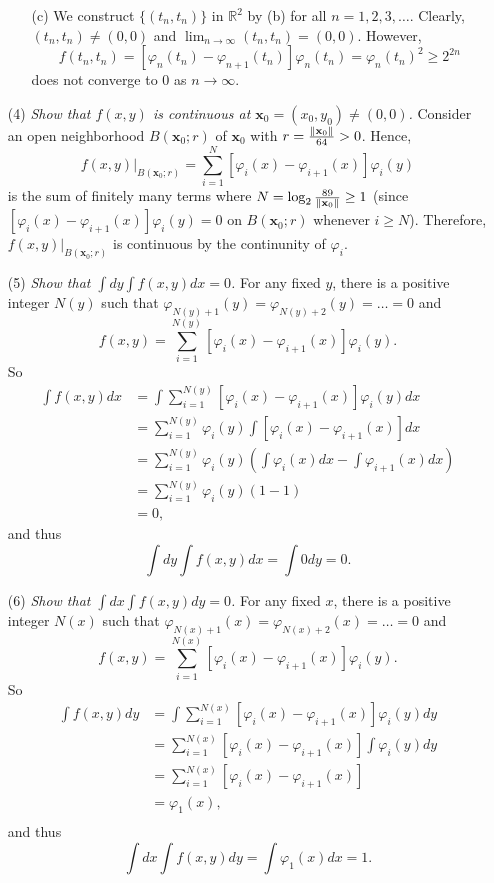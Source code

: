 \documentclass{article}
\begin{document}
\begin{enumerate}
\begin{enumerate}
  \item[(c)]
    We construct $\{ (t_n,t_n) \}$ in $\mathbb{R}^2$ by (b) for all $n=1,2,3,\ldots$.
    Clearly, $(t_n,t_n) \neq (0,0)$ and $\lim_{n \to \infty}(t_n,t_n) = (0,0)$.
    However,
    \[
      f(t_n,t_n)
      = [\varphi_{n}(t_n) - \varphi_{n+1}(t_n)]\varphi_{n}(t_n)
      = \varphi_{n}(t_n)^2
      \geq 2^{2n}
    \]
    does not converge to $0$ as $n \to \infty$.
  \end{enumerate}

\item[(4)]
  \emph{Show that $f(x,y)$ is continuous at $\mathbf{x}_0 = (x_0,y_0) \neq (0,0)$.}
  Consider an open neighborhood
  $B(\mathbf{x}_0;r)$ of $\mathbf{x}_0$ with $r=\frac{\norm{\mathbf{x}_0}}{64} > 0$.
  Hence,
  \[
    f(x,y)|_{B(\mathbf{x}_0;r)}
    = \sum_{i=1}^{N}[ \varphi_i(x)-\varphi_{i+1}(x) ] \varphi_i(y)
  \]
  is the sum of finitely many terms
  where $N = \log_2 \frac{89}{\norm{\mathbf{x}_0}} \geq 1$
  (since $[ \varphi_i(x)-\varphi_{i+1}(x) ] \varphi_i(y) = 0$
  on ${B(\mathbf{x}_0;r)}$ whenever $i \geq N$).
  Therefore,
  $f(x,y)|_{B(\mathbf{x}_0;r)}$ is continuous
  by the continunity of $\varphi_i$.

\item[(5)]
  \emph{Show that $\int dy \int f(x,y) dx = 0$.}
  For any fixed $y$,
  there is a positive integer $N(y)$ such that
  $\varphi_{N(y)+1}(y) = \varphi_{N(y)+2}(y) = \ldots = 0$ and
  \[
    f(x,y) = \sum_{i=1}^{N(y)}[ \varphi_i(x)-\varphi_{i+1}(x) ] \varphi_i(y).
  \]
  So
  \begin{align*}
    \int f(x,y) dx
    &= \int \sum_{i=1}^{N(y)}[ \varphi_i(x)-\varphi_{i+1}(x) ] \varphi_i(y) dx \\
    &= \sum_{i=1}^{N(y)} \varphi_i(y) \int [ \varphi_i(x)-\varphi_{i+1}(x) ] dx \\
    &= \sum_{i=1}^{N(y)} \varphi_i(y) \left( \int \varphi_i(x) dx - \int \varphi_{i+1}(x) dx \right) \\
    &= \sum_{i=1}^{N(y)} \varphi_i(y) \left( 1 - 1 \right) \\
    &= 0,
  \end{align*}
  and thus
  \[
    \int dy \int f(x,y) dx = \int 0 dy = 0.
  \]

\item[(6)]
  \emph{Show that $\int dx \int f(x,y) dy = 0$.}
  For any fixed $x$,
  there is a positive integer $N(x)$ such that
  $\varphi_{N(x)+1}(x) = \varphi_{N(x)+2}(x) = \ldots = 0$ and
  \[
    f(x,y) = \sum_{i=1}^{N(x)}[ \varphi_i(x)-\varphi_{i+1}(x) ] \varphi_i(y).
  \]
  So
  \begin{align*}
    \int f(x,y) dy
    &= \int \sum_{i=1}^{N(x)}[ \varphi_i(x)-\varphi_{i+1}(x) ] \varphi_i(y) dy \\
    &= \sum_{i=1}^{N(x)} [ \varphi_i(x)-\varphi_{i+1}(x) ] \int \varphi_i(y) dy \\
    &= \sum_{i=1}^{N(x)} [ \varphi_i(x)-\varphi_{i+1}(x) ] \\
    &= \varphi_1(x), \\
  \end{align*}
  and thus
  \[
    \int dx \int f(x,y) dy = \int \varphi_1(x) dx = 1.
  \]
\end{enumerate}
\end{document}

